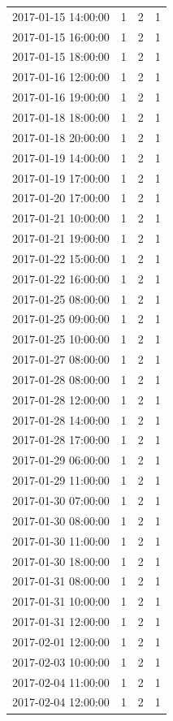 \begin{tabular}{lrrr}
2017-01-15 14:00:00 & 1 & 2 & 1 \\
2017-01-15 16:00:00 & 1 & 2 & 1 \\
2017-01-15 18:00:00 & 1 & 2 & 1 \\
2017-01-16 12:00:00 & 1 & 2 & 1 \\
2017-01-16 19:00:00 & 1 & 2 & 1 \\
2017-01-18 18:00:00 & 1 & 2 & 1 \\
2017-01-18 20:00:00 & 1 & 2 & 1 \\
2017-01-19 14:00:00 & 1 & 2 & 1 \\
2017-01-19 17:00:00 & 1 & 2 & 1 \\
2017-01-20 17:00:00 & 1 & 2 & 1 \\
2017-01-21 10:00:00 & 1 & 2 & 1 \\
2017-01-21 19:00:00 & 1 & 2 & 1 \\
2017-01-22 15:00:00 & 1 & 2 & 1 \\
2017-01-22 16:00:00 & 1 & 2 & 1 \\
2017-01-25 08:00:00 & 1 & 2 & 1 \\
2017-01-25 09:00:00 & 1 & 2 & 1 \\
2017-01-25 10:00:00 & 1 & 2 & 1 \\
2017-01-27 08:00:00 & 1 & 2 & 1 \\
2017-01-28 08:00:00 & 1 & 2 & 1 \\
2017-01-28 12:00:00 & 1 & 2 & 1 \\
2017-01-28 14:00:00 & 1 & 2 & 1 \\
2017-01-28 17:00:00 & 1 & 2 & 1 \\
2017-01-29 06:00:00 & 1 & 2 & 1 \\
2017-01-29 11:00:00 & 1 & 2 & 1 \\
2017-01-30 07:00:00 & 1 & 2 & 1 \\
2017-01-30 08:00:00 & 1 & 2 & 1 \\
2017-01-30 11:00:00 & 1 & 2 & 1 \\
2017-01-30 18:00:00 & 1 & 2 & 1 \\
2017-01-31 08:00:00 & 1 & 2 & 1 \\
2017-01-31 10:00:00 & 1 & 2 & 1 \\
2017-01-31 12:00:00 & 1 & 2 & 1 \\
2017-02-01 12:00:00 & 1 & 2 & 1 \\
2017-02-03 10:00:00 & 1 & 2 & 1 \\
2017-02-04 11:00:00 & 1 & 2 & 1 \\
2017-02-04 12:00:00 & 1 & 2 & 1 \\

\end{tabular}
